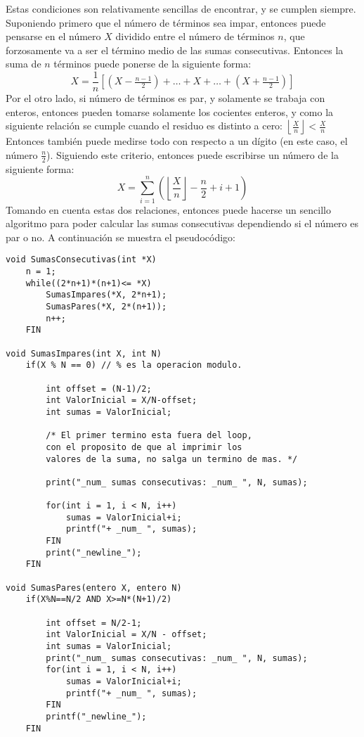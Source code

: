 \documentclass[conference]{IEEEtran}
\begin{document}
        Estas condiciones son relativamente sencillas de encontrar, y se cumplen
        siempre. Suponiendo primero que el número de términos sea impar, entonces
        puede pensarse en el número $X$ dividido entre el número de términos $n$,
        que forzosamente va a ser el término medio de las sumas consecutivas.
        Entonces la suma de $n$ términos puede ponerse de la siguiente forma:
        \begin{equation*}
            X = \frac{1}{n}\left[(X-\tfrac{n-1}{2})+\dots+X+\dots+(X+\tfrac{n-1}{2})\right]
        \end{equation*}
        Por el otro lado, si número de términos es par, y solamente se trabaja
        con enteros, entonces pueden tomarse solamente los cocientes enteros, y
        como la siguiente relación se cumple cuando el residuo es distinto a cero: 
        $\left\lfloor\tfrac{X}{n}\right\rfloor<\tfrac{X}{n}$
        Entonces también puede medirse todo con respecto a un dígito (en este caso,
        el número $\tfrac{n}{2}$). Siguiendo este criterio, entonces puede escribirse
        un número de la siguiente forma:
        \begin{equation*}
            X = \sum_{i=1}^n\left(\left\lfloor\frac{X}{n}\right\rfloor-\frac{n}{2}+i+1\right)
        \end{equation*}
        Tomando en cuenta estas dos relaciones, entonces puede hacerse un sencillo
        algoritmo para poder calcular las sumas consecutivas dependiendo si el 
        número es par o no. A continuación se muestra el pseudocódigo:
        \begin{lstlisting}[style=mystyle]
void SumasConsecutivas(int *X)
    n = 1;
    while((2*n+1)*(n+1)<= *X) 
        SumasImpares(*X, 2*n+1); 
        SumasPares(*X, 2*(n+1));
        n++;
    FIN

void SumasImpares(int X, int N)
    if(X % N == 0) // % es la operacion modulo.
    
        int offset = (N-1)/2;
        int ValorInicial = X/N-offset; 
        int sumas = ValorInicial;

        /* El primer termino esta fuera del loop, 
        con el proposito de que al imprimir los 
        valores de la suma, no salga un termino de mas. */

        print("_num_ sumas consecutivas: _num_ ", N, sumas);

        for(int i = 1, i < N, i++)
            sumas = ValorInicial+i;
            printf("+ _num_ ", sumas);
        FIN
        print("_newline_");
    FIN

void SumasPares(entero X, entero N)
    if(X%N==N/2 AND X>=N*(N+1)/2)

        int offset = N/2-1;
        int ValorInicial = X/N - offset; 
        int sumas = ValorInicial;
        print("_num_ sumas consecutivas: _num_ ", N, sumas);
        for(int i = 1, i < N, i++)
            sumas = ValorInicial+i;
            printf("+ _num_ ", sumas);
        FIN
        printf("_newline_");
    FIN
        \end{lstlisting}
        
        
\end{document}
